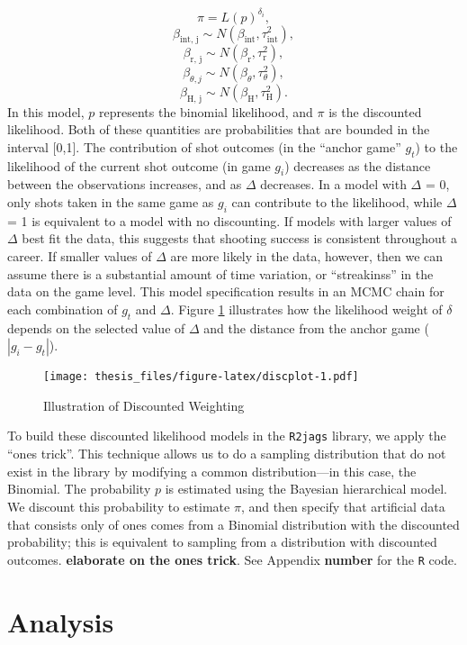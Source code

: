 \documentclass[12pt,twoside]{dukestatscithesis}
\theoremstyle{definition}
\theoremstyle{definition}
\theoremstyle{definition}
\theoremstyle{remark}
\begin{document}
\[
\pi = L(p)^{\delta_i},
\] \[
\beta_{\text{int, j}} \sim N(\beta_{\text{int}}, \tau^2_{\text{int}}),
\] \[
\beta_{\text{r, j}} \sim N(\beta_{\text{r}}, \tau^2_{\text{r}}),
\] \[
\beta_{\theta, j} \sim N(\beta_{\theta}, \tau^2_{\theta}),
\] \[
\beta_{\text{H, j}} \sim N(\beta_{\text{H}}, \tau^2_{\text{H}}).
\] In this model, \(p\) represents the binomial likelihood, and \(\pi\)
is the discounted likelihood. Both of these quantities are probabilities
that are bounded in the interval {[}0,1{]}. The contribution of shot
outcomes (in the ``anchor game'' \(g_t\)) to the likelihood of the
current shot outcome (in game \(g_i\)) decreases as the distance between
the observations increases, and as \(\Delta\) decreases. In a model with
\(\Delta\) = 0, only shots taken in the same game as \(g_i\) can
contribute to the likelihood, while \(\Delta\) = 1 is equivalent to a
model with no discounting. If models with larger values of \(\Delta\)
best fit the data, this suggests that shooting success is consistent
throughout a career. If smaller values of \(\Delta\) are more likely in
the data, however, then we can assume there is a substantial amount of
time variation, or ``streakinss'' in the data on the game level. This
model specification results in an MCMC chain for each combination of
\(g_t\) and \(\Delta\). Figure \ref{fig:discplot} illustrates how the
likelihood weight of \(\delta\) depends on the selected value of
\(\Delta\) and the distance from the anchor game (\(|g_i - g_t|\)).
\begin{figure}[htbp]
\centering
\texttt{[image: thesis\_files/figure-latex/discplot-1.pdf]}
\caption{\label{fig:discplot}Illustration of Discounted Weighting}
\end{figure}
To build these discounted likelihood models in the \texttt{R2jags}
library, we apply the ``ones trick''. This technique allows us to do a
sampling distribution that do not exist in the library by modifying a
common distribution---in this case, the Binomial. The probability \(p\)
is estimated using the Bayesian hierarchical model. We discount this
probability to estimate \(\pi\), and then specify that artificial data
that consists only of ones comes from a Binomial distribution with the
discounted probability; this is equivalent to sampling from a
distribution with discounted outcomes. \textbf{elaborate on the ones
trick}. See Appendix \textbf{number} for the \texttt{R} code.

\section{Analysis}\label{analysis}
\end{document}
